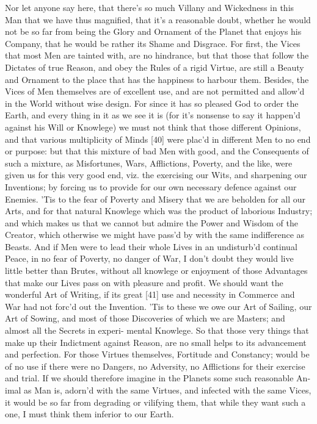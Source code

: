 \documentclass[letterpaper]{book}
\begin{document}
Nor let anyone say here, that there's so much Villany and Wickedness in this
Man that we have thus magnified, that it's a reasonable doubt, whether he
would not be so far from being the Glory and Ornament of the Planet that
enjoys his Company, that he would be rather its Shame and Disgrace.  For
first, the Vices that most Men are tainted with, are no hindrance, but that
those that follow the Dictates of true Reason, and obey the Rules of a rigid
Virtue, are still a Beauty and Ornament to the place that has the happiness
to harbour them. Besides, the Vices of Men themselves are of excellent use,
and are not permitted and allow'd in the World without wise design. For
since it has so pleased God to order the Earth, and every thing in it as we
see it is (for it's nonsense to say it happen'd against his Will or
Knowlege) we must not think that those different Opinions, and that various
multiplicity of Minds [40] were plac'd in different Men to no end or
purpose: but that this mixture of bad Men with good, and the Consequents of
such a mixture, as Misfortunes, Wars, Afflictions, Poverty, and the like,
were given us for this very good end, viz. the exercising our Wits, and
sharpening our Inventions; by forcing us to provide for our own necessary
defence against our Enemies.  'Tis to the fear of Poverty and Misery that we
are beholden for all our Arts, and for that natural Knowlege which was the
product of laborious Industry; and which makes us that we cannot but admire
the Power and Wisdom of the Creator, which otherwise we might have pass'd by
with the same indifference as Beasts. And if Men were to lead their whole
Lives in an undisturb'd continual Peace, in no fear of Poverty, no danger of
War, I don't doubt they would live little better than Brutes, without all
knowlege or enjoyment of those Advantages that make our Lives pass on with
pleasure and profit. We should want the wonderful Art of Writing, if its
great [41] use and necessity in Commerce and War had not forc'd out the
Invention.  'Tis to these we owe our Art of Sailing, our Art of Sowing, and
most of those Discoveries of which we are Masters; and almost all the
Secrets in experi- mental Knowlege. So that those very things that make up
their Indictment against Reason, are no small helps to its advancement and
perfection. For those Virtues themselves, Fortitude and Constancy; would be
of no use if there were no Dangers, no Adversity, no Afflictions for their
exercise and trial.  If we should therefore imagine in the Planets some such
reasonable An- imal as Man is, adorn'd with the same Virtues, and infected
with the same Vices, it would be so far from degrading or vilifying them,
that while they want such a one, I must think them inferior to our Earth.
\end{document}
